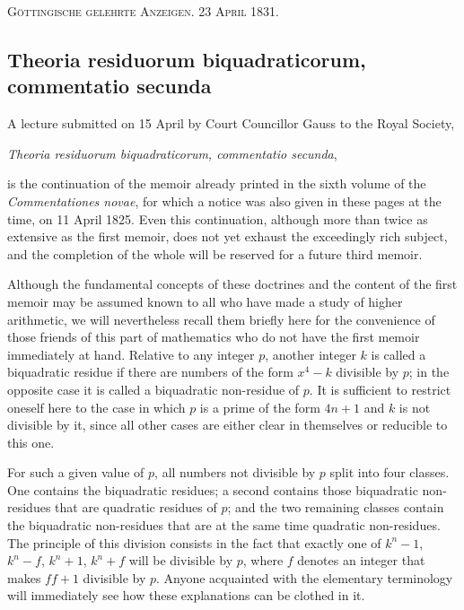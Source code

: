 \documentclass[12pt]{article}
\begin{document}
\begin{center}
\textsc{Göttingische gelehrte Anzeigen. 23 April 1831.}
\end{center}

\subsection*{Theoria residuorum biquadraticorum, commentatio secunda}

A lecture submitted on 15 April by Court Councillor Gauss to the Royal Society,
\begin{center}\textit{Theoria residuorum biquadraticorum, commentatio secunda},\end{center}
is the continuation of the memoir already printed in the sixth volume of the \textit{Commentationes novae}, for which a notice was also given in these pages at the time, on 11 April 1825. Even this continuation, although more than twice as extensive as the first memoir, does not yet exhaust the exceedingly rich subject, and the completion of the whole will be reserved for a future third memoir.

Although the fundamental concepts of these doctrines and the content of the first memoir may be assumed known to all who have made a study of higher arithmetic, we will nevertheless recall them briefly here for the convenience of those friends of this part of mathematics who do not have the first memoir immediately at hand. Relative to any integer $p$, another integer $k$ is called a biquadratic residue if there are numbers of the form $x^4-k$ divisible by $p$; in the opposite case it is called a biquadratic non-residue of $p$. It is sufficient to restrict oneself here to the case in which $p$ is a prime of the form $4n+1$ and $k$ is not divisible by it, since all other cases are either clear in themselves or reducible to this one.

For such a given value of $p$, all numbers not divisible by $p$ split into four classes. One contains the biquadratic residues; a second contains those biquadratic non-residues that are quadratic residues of $p$; and the two remaining classes contain the biquadratic non-residues that are at the same time quadratic non-residues. The principle of this division consists in the fact that exactly one of $k^n-1$, $k^n-f$, $k^n+1$, $k^n+f$ will be divisible by $p$, where $f$ denotes an integer that makes $ff+1$ divisible by $p$. Anyone acquainted with the elementary terminology will immediately see how these explanations can be clothed in it.
\end{document}
